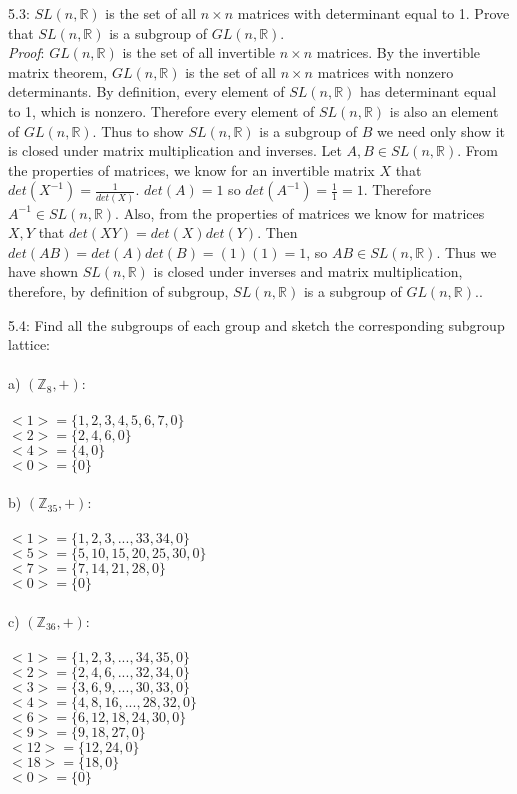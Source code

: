 \documentclass{scrartcl}
\begin{document}
5.3: $SL(n,\mathbb{R})$ is the set of all $n\times n$ matrices with determinant equal to 1. Prove that $SL(n,\mathbb{R})$ is a subgroup of $GL(n,\mathbb{R})$.\\

\emph{Proof}: $GL(n,\mathbb{R})$ is the set of all invertible $n\times n$ matrices. By the invertible matrix theorem, $GL(n,\mathbb{R})$ is the set of all $n\times n$ matrices with nonzero determinants. By definition, every element of $SL(n,\mathbb{R})$ has determinant equal to 1, which is nonzero. Therefore every element of $SL(n,\mathbb{R})$ is also an element of $GL(n,\mathbb{R})$. Thus to show $SL(n,\mathbb{R})$ is a subgroup of $B$ we need only show it is closed under matrix multiplication and inverses. Let $A,B \in SL(n,\mathbb{R})$. From the properties of matrices, we know for an invertible matrix $X$ that $det(X^{-1})=\frac{1}{det(X)}$. $det(A)=1$ so $det(A^{-1})=\frac{1}{1}=1$. Therefore $A^{-1} \in SL(n,\mathbb{R})$. Also, from the properties of matrices we know for matrices $X,Y$ that $det(XY)=det(X)det(Y)$. Then $det(AB)=det(A)det(B)=(1)(1)=1$, so $AB \in SL(n,\mathbb{R})$. Thus we have shown $SL(n,\mathbb{R})$ is closed under inverses and matrix multiplication, therefore, by definition of subgroup, $SL(n,\mathbb{R})$ is a subgroup of $GL(n,\mathbb{R})$.\pagebreak.

5.4: Find all the subgroups of each group and sketch the corresponding subgroup lattice:\\\\
a) $(\mathbb{Z}_8,+)$:\\\\
$<1>=\{1,2,3,4,5,6,7,0\}$\\
$<2>=\{2,4,6,0\}$\\
$<4>=\{4,0\}$\\
$<0>=\{0\}$\\\\
b) $(\mathbb{Z}_{35},+)$:\\\\
$<1>=\{1,2,3,...,33,34,0\}$\\
$<5>=\{5,10,15,20,25,30,0\}$\\
$<7>=\{7,14,21,28,0\}$\\
$<0>=\{0\}$\\\\
c) $(\mathbb{Z}_{36},+)$:\\\\
$<1>=\{1,2,3,...,34,35,0\}$\\
$<2>=\{2,4,6,...,32,34,0\}$\\
$<3>=\{3,6,9,...,30,33,0\}$\\
$<4>=\{4,8,16,...,28,32,0\}$\\
$<6>=\{6,12,18,24,30,0\}$\\
$<9>=\{9,18,27,0\}$\\
$<12>=\{12,24,0\}$\\
$<18>=\{18,0\}$\\
$<0>=\{0\}$\pagebreak
\end{document}
